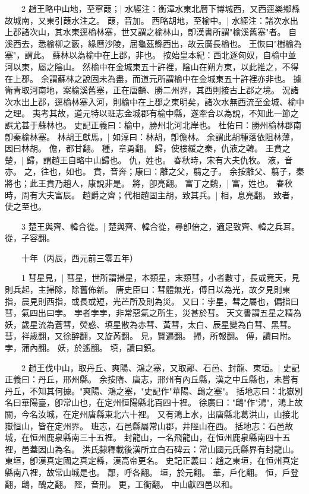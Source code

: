 　　2 趙王略中山地，至寧葭；|{
	水經注：衡漳水東北曆下博城西，又西逕樂鄉縣故城南，又東引葭水注之。
	葭，音加。
}
西略胡地，至榆中。|{
	水經注：諸次水出上郡諸次山，其水東逕榆林塞，世又謂之榆林山，卽漢書所謂"榆溪舊塞"者。
	自溪西去，悉榆柳之藪，緣曆沙陵，屆龜茲縣西出，故云廣長榆也。
	王恢曰"樹榆為塞"，謂此。
	蘇林以為榆中在上郡，非也。
	按始皇本紀：西北逐匈奴，自榆中並河以東，屬之陰山。
	然榆中在金城東五十許裡，陰山在朔方東，以此推之，不得在上郡。
	余謂蘇林之說固未為盡，而道元所謂榆中在金城東五十許裡亦非也。
	據衛青取河南地，案榆溪舊塞，正在唐麟、勝二州界，其西則接古上郡之境。
	況諸次水出上郡，逕榆林塞入河，則榆中在上郡之東明矣，諸次水無西流至金城、榆中之理。
	夷考其故，道元特以班志金城郡有榆中縣，遂牽合以為說，不知此一節之誤尤甚于蘇林也。
	史記正義曰：榆中，勝州北河北岸也。
	杜佑曰：勝州榆林郡南卽秦榆林塞。
}
林胡王獻馬，|{
	如淳曰：林胡，卽儋林。
	余謂此胡種落依阻林薄，因曰林胡。
	儋，都甘翻。
	種，章勇翻。
}
歸，使樓緩之秦，仇液之韓。
	王賁之楚，|{
	歸，謂趙王自略中山歸也。
	仇，姓也。
	春秋時，宋有大夫仇牧。
	液，音亦。
	之，往也，如也。
	賁，音奔；康曰：離之父，翦之子。
	余按離父、翦子，秦將也；此王賁乃趙人，康說非是。
	將，卽亮翻。
}
富丁之魏，|{
	富，姓也。
	春秋時，周有大夫富辰。
}
趙爵之齊；代相趙固主胡，致其兵。|{
	相，息亮翻。
	致者，使之至也。
}

　　3 楚王與齊、韓合從。|{
	楚與齊、韓合從，尋卽倍之，適足致齊、韓之兵耳。
	從，子容翻。
}

　　十年（丙辰，西元前三零五年）

　　1 彗星見，|{
	彗星，世所謂掃星，本類星，末類彗，小者數寸，長或竟天，見則兵起，主掃除，除舊佈新。
	唐史臣曰：彗體無光，傅日以為光，故夕見則東指，晨見則西指，或長或短，光芒所及則為災。
	又曰：孛星，彗之屬也，偏指曰彗，氣四出曰孛。
	孛者孛孛，非常惡氣之所生，災甚於彗。
	天文書謂五星之精為妖，歲星流為蒼彗，熒惑、填星散為赤彗、黃彗，太白、辰星變為白彗、黑彗。
	彗，祥歲翻，又徐醉翻，又旋芮翻。
	見，賢遍翻。
	掃，所報翻。
	傅，讀曰附。
	孛，蒲內翻。
	妖，於遙翻。
	填，讀曰鎮。
}

　　2 趙王伐中山，取丹丘、爽陽、鴻之塞，又取鄗、石邑、封龍、東垣。|{
	史記正義曰：丹丘，邢州縣。
	余按隋、唐志，邢州有內丘縣，漢之中丘縣也，未嘗有丹丘，不知其何據。"爽陽、鴻之塞，"史記作"華陽、鴟之塞"。
	括地志曰：北嶽別名曰華陽臺，卽常山也，在定州恒陽縣北百四十裡。
	徐廣曰："鴟"作"鴻"，鴻上故關，今名汝城，在定州唐縣東北六十裡。
	又有鴻上水，出唐縣北葛洪山，山接北嶽恒山，皆在定州界。
	班志，石邑縣屬常山郡，井陘山在西。
	括地志：石邑故城，在恒州鹿泉縣南三十五裡。
	封龍山，一名飛龍山，在恒州鹿泉縣南四十五裡，邑蓋因山為名。
	洪氏隸釋載後漢所立白石碑云：常山國元氏縣界有封龍山。
	東垣，卽漢真定國之真定縣，漢高帝更名。
	史記正義曰：趙之東垣，在恒州真定縣南八裡，故常山城是也。
	鄗，呼各翻。
	垣，於元翻。
	華，戶化翻。
	恒，戶登翻，鴟，醜之翻。
	陘，音刑。
	更，工衡翻。
}
中山獻四邑以和。


